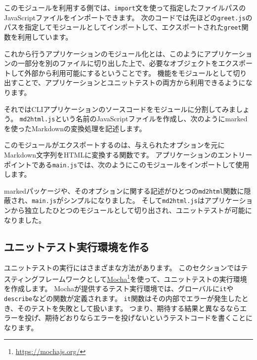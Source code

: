 このモジュールを利用する側では、\texttt{import}文を使って指定したファイルパスのJavaScriptファイルをインポートできます。
次のコードでは先ほどの\texttt{greet.js}のパスを指定してモジュールとしてインポートして、エクスポートされた\texttt{greet}関数を利用しています。



これから行うアプリケーションのモジュール化とは、このようにアプリケーションの一部分を別のファイルに切り出した上で、必要なオブジェクトをエクスポートして外部から利用可能にするということです。
機能をモジュールとして切り出すことで、アプリケーションとユニットテストの両方から利用できるようになります。

それではCLIアプリケーションのソースコードをモジュールに分割してみましょう。
\texttt{md2html.js}という名前のJavaScriptファイルを作成し、次のようにmarkedを使ったMarkdownの変換処理を記述します。



このモジュールがエクスポートするのは、与えられたオプションを元にMarkdown文字列をHTMLに変換する関数です。
アプリケーションのエントリーポイントである\texttt{main.js}では、次のようにこのモジュールをインポートして使用します。



markedパッケージや、そのオプションに関する記述がひとつの\texttt{md2html}関数に隠蔽され、\texttt{main.js}がシンプルになりました。
そして\texttt{md2html.js}はアプリケーションから独立したひとつのモジュールとして切り出され、ユニットテストが可能になりました。

\hypertarget{create-env}{%
\subsection{ユニットテスト実行環境を作る}\label{create-env}}

ユニットテストの実行にはさまざまな方法があります。
このセクションではテスティングフレームワークとして\href{https://mochajs.org/}{Mocha}\footnote{\url{https://mochajs.org/}}を使って、ユニットテストの実行環境を作成します。
Mochaが提供するテスト実行環境では、グローバルに\texttt{it}や\texttt{describe}などの関数が定義されます。
\texttt{it}関数はその内部でエラーが発生したとき、そのテストを失敗として扱います。
つまり、期待する結果と異なるならエラーを投げ、期待どおりならエラーを投げないというテストコードを書くことになります。


